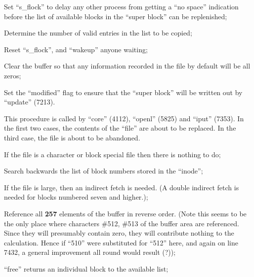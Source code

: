 \item[6972:] Set ``s\_flock'' to delay any  other
  process from getting a ``no space''
  indication  before  the  list  of
  available  blocks  in  the ``super
  block'' can be replenished;

\item[6975:] Determine  the  number  of  valid
entries in the list to be copied;

\item[6978:] Reset  ``s\_flock'',  and   ``wakeup''
      anyone waiting;

\item[6982:] Clear  the  buffer  so  that  any
      information  recorded in the file
      by default will be all zeros;

\item[6983:] Set the ``modified'' flag to ensure
      that  the  ``super  block'' will be
      written out by ``update'' (7213).
\ed


This  procedure  is  called  by  ``core''
(4112),   ``openl''   (5825)  and  ``iput''
(7353). In the  first  two  cases,  the
contents  of the ``file'' are about to be
replaced.  In the third case, the  file
is about to be abandoned.

\bd
\item[7421:] If the file  is  a  character  or
      block  special file then there is
      nothing to do;

\item[7423:] Search  backwards  the  list   of
      block   numbers   stored  in  the
      ``inode'';

\item[7425:] If the file is large,  then  an
indirect fetch is needed. (A double indirect fetch is needed  for
blocks    numbered    seven   and
higher.);


\item[7427:] Reference all {\bf 257} elements of the
  buffer  in  reverse  order. (Note
  this seems to be the  only  place
  where  characters  \#512,  \#513 of
  the buffer area  are  referenced.
  Since  they  will presumably contain zero, they  will  contribute
  nothing to the calculation. Hence
  if  ``510''  were  substituted  for
  ``512''  here,  and  again  on line
  7432, a general  improvement  all
  round would result (?));


\item[7438:] ``free''  returns   an   individual
      block to the available list;


